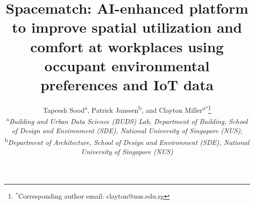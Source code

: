 \documentclass[]{interact}
\theoremstyle{plain}%
\theoremstyle{definition}
\theoremstyle{remark}
\begin{document}

\title{Spacematch: AI-enhanced platform to improve spatial utilization and comfort at workplaces using occupant environmental preferences and IoT data}

\author{Tapeesh Sood\textsuperscript{a},
Patrick Janssen\textsuperscript{b},
and Clayton Miller\textsuperscript{a}$^{\ast}$\thanks{$^\ast$Corresponding author email: clayton@nus.edu.sg}\\
\vspace{6pt}
\textsuperscript{a}{\em Building and Urban Data Science (BUDS) Lab, Department of Building, School of Design and Environment (SDE), National University of Singapore (NUS)};\\
\textsuperscript{b}{\em Department of Architecture, School of Design and Environment (SDE), National University of Singapore (NUS)}
}

\maketitle
\end{document}
